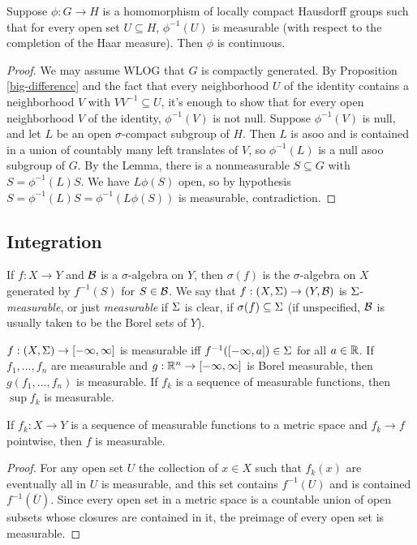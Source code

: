 \documentclass[letterpaper,11pt]{report}
\begin{document}
\begin{thm} Suppose $\phi : G \rightarrow H$ is a homomorphism of locally compact Hausdorff groups such that for every open set $U \subseteq H$, $\phi^{-1}(U)$ is measurable (with respect to the completion of the Haar measure). Then $\phi$ is continuous.
\end{thm}
\begin{proof} We may assume WLOG that $G$ is compactly generated. By Proposition \ref{big-difference} and the fact that every neighborhood $U$ of the identity contains a neighborhood $V$ with $VV^{-1} \subseteq U$, it's enough to show that for every open neighborhood $V$ of the identity, $\phi^{-1}(V)$ is not null. Suppose $\phi^{-1}(V)$ is null, and let $L$ be an open $\sigma$-compact subgroup of $H$. Then $L$ is asoo and is contained in a union of countably many left translates of $V$, so $\phi^{-1}(L)$ is a null asoo subgroup of $G$. By the Lemma, there is a nonmeasurable $S \subseteq G$ with $S = \phi^{-1}(L)S$. We have $L\phi(S)$ open, so by hypothesis $S = \phi^{-1}(L)S = \phi^{-1}(L\phi(S))$ is measurable, contradiction.
\end{proof}

\subsection{Integration}

\begin{defn} If $f:X\rightarrow Y$ and $\mathcal{B}$ is a $\sigma$-algebra on $Y$, then $\sigma(f)$ is the $\sigma$-algebra on $X$ generated by $f^{-1}(S)$ for $S \in \mathcal{B}$. We say that $f:(X,\Sigma) \rightarrow (Y,\mathcal{B})$ is $\Sigma$-\emph{measurable}, or just \emph{measurable} if $\Sigma$ is clear, if $\sigma(f) \subseteq \Sigma$ (if unspecified, $\mathcal{B}$ is usually taken to be the Borel sets of $Y$).
\end{defn}

\begin{prop} $f:(X,\Sigma) \rightarrow [-\infty,\infty]$ is measurable iff $f^{-1}([-\infty,a]) \in \Sigma$ for all $a \in \mathbb{R}$. If $f_1, ..., f_n$ are measurable and $g:\mathbb{R}^n \rightarrow [-\infty,\infty]$ is Borel measurable, then $g(f_1, ..., f_n)$ is measurable. If $f_k$ is a sequence of measurable functions, then $\sup f_k$ is measurable.
\end{prop}

\begin{prop} If $f_k : X \rightarrow Y$ is a sequence of measurable functions to a metric space and $f_k \rightarrow f$ pointwise, then $f$ is measurable.
\end{prop}
\begin{proof} For any open set $U$ the collection of $x \in X$ such that $f_k(x)$ are eventually all in $U$ is measurable, and this set contains $f^{-1}(U)$ and is contained $f^{-1}(\overline{U})$. Since every open set in a metric space is a countable union of open subsets whose closures are contained in it, the preimage of every open set is measurable.
\end{proof}
\end{document}
